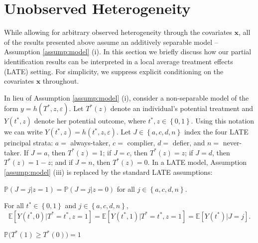 \section{Unobserved Heterogeneity}
\label{sec:het}
While allowing for arbitrary observed heterogeneity through the covariates $\mathbf{x}$, all of the results presented above assume an additively separable model -- Assumption \ref{assump:model} (i).
In this section we briefly discuss how our partial identification results can be interpreted in a local average treatment effects (LATE) setting.
For simplicity, we suppress explicit conditioning on the covariates $\mathbf{x}$ throughout. 

In lieu of Assumption \ref{assump:model} (i), consider a non-separable model of the form $y = h(T^*,z,\varepsilon)$.
Let $T^*(z)$ denote an individual's potential treatment and $Y(t^*,z)$ denote her potential outcome, where $t^*,z\in \left\{ 0,1 \right\}$.
Using this notation we can write $Y(t^*,z) = h(t^*,z,\varepsilon)$.
Let $J \in \left\{ a, c, d, n \right\}$ index the four LATE principal strata: $a = $ always-taker, $c = $ complier, $d = $ defier, and $n =$ never-taker.
If $J=a$, then $T^*(z) = 1$; if $J=c$, then $T^*(z) = z$; if $J=d$, then $T^*(z) = 1 - z$; and if $J=n$, then $T^*(z)=0$.
In a LATE model, Assumption \ref{assump:model} (iii) is replaced by the standard LATE assumptions:
\begin{assump}
  \label{assump:LATEtype}
    $\mathbb{P}(J=j|z=1) = \mathbb{P}(J=j|z=0)$ 
  for all  $j\in \left\{ a, c, d, n \right\}$.
\end{assump}
\begin{assump}
  \label{assump:LATEexclude}
    For all $t^* \in \left\{ 0,1 \right\}$ and $j\in \left\{ a, c, d, n \right\}$,
    \[\mathbb{E}\left[Y(t^*,0)|T^*=t^*,z=1\right]=\mathbb{E}\left[Y(t^*,1)|T^*=t^*,z=1\right] = \mathbb{E}[Y(t^*)|J=j].\]
\end{assump}
\begin{assump}[Monotonicity]
  \label{assump:LATEmono}
    $\mathbb{P}\big(T^*(1) \geq T^*(0)\big) = 1$ 
\end{assump}

